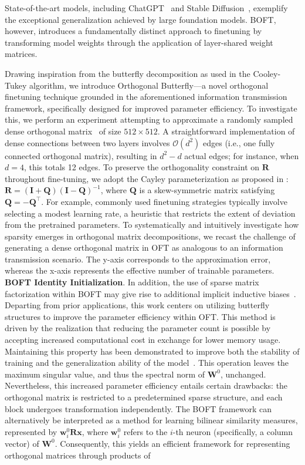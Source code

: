 State-of-the-art models, including ChatGPT~\cite{brown2020language,chen2021evaluating} and Stable Diffusion~\cite{rombach2022high}, exemplify the exceptional generalization achieved by large foundation models. BOFT, however, introduces a fundamentally distinct approach to finetuning by transforming model weights through the application of layer-shared weight matrices. \item Drawing inspiration from the butterfly decomposition as used in the Cooley-Tukey algorithm, we introduce Orthogonal Butterfly—a novel orthogonal finetuning technique grounded in the aforementioned information transmission framework, specifically designed for improved parameter efficiency. To investigate this, we perform an experiment attempting to approximate a randomly sampled dense orthogonal matrix~\cite{anderson1987generation} of size $512\times 512$. A straightforward implementation of dense connections between two layers involves $\mathcal{O}(d^2)$ edges (i.e., one fully connected orthogonal matrix), resulting in $d^2 - d$ actual edges; for instance, when $d=4$, this totals 12 edges. To preserve the orthogonality constraint on $\bm{R}$ throughout fine-tuning, we adopt the Cayley parameterization as proposed in \cite{qiu2023controlling,liu2021orthogonal}: $\bm{R}=(\bm{I}+\bm{Q})(\bm{I}-\bm{Q})^{-1}$, where $\bm{Q}$ is a skew-symmetric matrix satisfying $\bm{Q}=-\bm{Q}^\top$. For example, commonly used finetuning strategies typically involve selecting a modest learning rate, a heuristic that restricts the extent of deviation from the pretrained parameters. To systematically and intuitively investigate how sparsity emerges in orthogonal matrix decompositions, we recast the challenge of generating a dense orthogonal matrix in OFT as analogous to an information transmission scenario. The y-axis corresponds to the approximation error, whereas the x-axis represents the effective number of trainable parameters. \textbf{BOFT Identity Initialization}. In addition, the use of sparse matrix factorization within BOFT may give rise to additional implicit inductive biases~\cite{gunasekar2017implicit,li2018algorithmic,liu2019neural}. Departing from prior applications, this work centers on utilizing butterfly structures to improve the parameter efficiency within OFT. This method is driven by the realization that reducing the parameter count is possible by accepting increased computational cost in exchange for lower memory usage. Maintaining this property has been demonstrated to improve both the stability of training and the generalization ability of the model~\cite{miyato2018spectral,yoshida2017spectral}. This operation leaves the maximum singular value, and thus the spectral norm of $\bm{W}^0$, unchanged. Nevertheless, this increased parameter efficiency entails certain drawbacks: the orthogonal matrix is restricted to a predetermined sparse structure, and each block undergoes transformation independently. The BOFT framework can alternatively be interpreted as a method for learning bilinear similarity measures, represented by $\bm{w}^0_i\bm{R}\bm{x}$, where $\bm{w}^0_i$ refers to the $i$-th neuron (specifically, a column vector) of $\bm{W}^0$. Consequently, this yields an efficient framework for representing orthogonal matrices through products of 